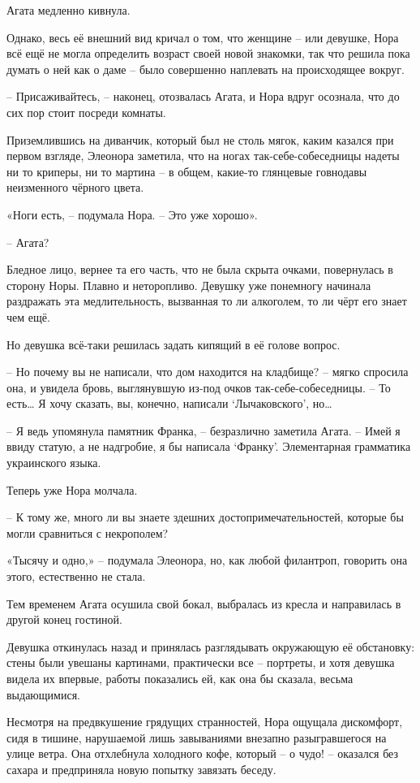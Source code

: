 \documentclass[
  a5paperpaper,
  DIV=11,
  numbers=noendperiod]{scrreprt}
\begin{document}
Агата медленно кивнула.

Однако, весь её внешний вид кричал о том, что женщине -- или девушке,
Нора всё ещё не могла определить возраст своей новой знакомки, так что
решила пока думать о ней как о даме -- было совершенно наплевать на
происходящее вокруг.

-- Присаживайтесь, -- наконец, отозвалась Агата, и Нора вдруг осознала,
что до сих пор стоит посреди комнаты.

Приземлившись на диванчик, который был не столь мягок, каким казался при
первом взгляде, Элеонора заметила, что на ногах так-себе-собеседницы
надеты ни то криперы, ни то мартина -- в общем, какие-то глянцевые
говнодавы неизменного чёрного цвета.

«Ноги есть, -- подумала Нора. -- Это уже хорошо».

-- Агата?

Бледное лицо, вернее та его часть, что не была скрыта очками,
повернулась в сторону Норы. Плавно и неторопливо. Девушку уже понемногу
начинала раздражать эта медлительность, вызванная то ли алкоголем, то ли
чёрт его знает чем ещё.

Но девушка всё-таки решилась задать кипящий в её голове вопрос.

-- Но почему вы не написали, что дом находится на кладбище? -- мягко
спросила она, и увидела бровь, выглянувшую из-под очков
так-себе-собеседницы. -- То есть\ldots{} Я хочу сказать, вы, конечно,
написали `Лычаковского', но\ldots{}

-- Я ведь упомянула памятник Франка, -- безразлично заметила Агата. --
Имей я ввиду статую, а не надгробие, я бы написала `Франку'.
Элементарная грамматика украинского языка.

Теперь уже Нора молчала.

-- К тому же, много ли вы знаете здешних достопримечательностей, которые
бы могли сравниться с некрополем?

«Тысячу и одно,» -- подумала Элеонора, но, как любой филантроп, говорить
она этого, естественно не стала.

Тем временем Агата осушила свой бокал, выбралась из кресла и направилась
в другой конец гостиной.

Девушка откинулась назад и принялась разглядывать окружающую её
обстановку: стены были увешаны картинами, практически все -- портреты, и
хотя девушка видела их впервые, работы показались ей, как она бы
сказала, весьма выдающимися.

Несмотря на предвкушение грядущих странностей, Нора ощущала дискомфорт,
сидя в тишине, нарушаемой лишь завываниями внезапно разыгравшегося на
улице ветра. Она отхлебнула холодного кофе, который -- о чудо! --
оказался без сахара и предприняла новую попытку завязать беседу.
\end{document}
